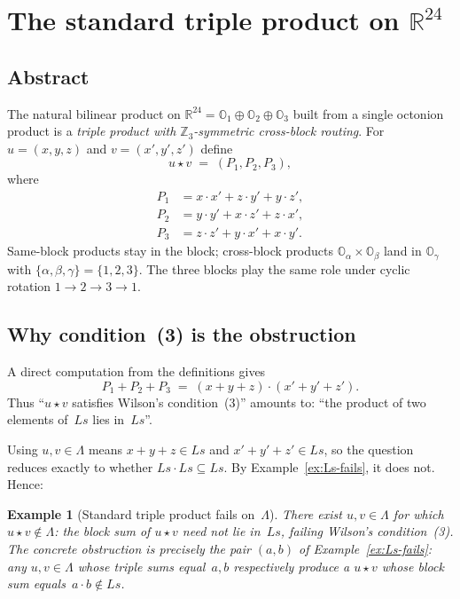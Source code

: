 \documentclass[11pt]{amsart}
\newcommand{\LL}{\Lambda}
\newcommand{\OO}{\mathbb{O}}
\newcommand{\ZZ}{\mathbb{Z}}
\newcommand{\RR}{\mathbb{R}}
\newtheorem{example}{Example}[section]
\begin{document}
\section{The standard triple product on $\RR^{24}$}

\subsection*{Abstract}

The natural bilinear product on $\RR^{24} = \OO_1 \oplus \OO_2
\oplus \OO_3$ built from a single octonion product is a
\emph{triple product with $\ZZ_3$-symmetric cross-block routing}.
For $u = (x, y, z)$ and $v = (x', y', z')$ define
\[
  u \star v \;=\; (P_1, P_2, P_3),
\]
where
\begin{align*}
  P_1 &= x \cdot x' + z \cdot y' + y \cdot z', \\
  P_2 &= y \cdot y' + x \cdot z' + z \cdot x', \\
  P_3 &= z \cdot z' + y \cdot x' + x \cdot y'.
\end{align*}
Same-block products stay in the block; cross-block products
$\OO_\alpha \times \OO_\beta$ land in $\OO_\gamma$ with
$\{\alpha, \beta, \gamma\} = \{1, 2, 3\}$.  The three blocks play
the same role under cyclic rotation $1 \to 2 \to 3 \to 1$.

\subsection*{Why condition~(3) is the obstruction}

A direct computation from the definitions gives
\[
  P_1 + P_2 + P_3 \;=\; (x + y + z) \cdot (x' + y' + z').
\]
Thus ``$u \star v$ satisfies Wilson's condition~(3)'' amounts to:
``the product of two elements of~$Ls$ lies in~$Ls$''.

Using $u, v \in \LL$ means $x + y + z \in Ls$ and $x' + y' + z'
\in Ls$, so the question reduces exactly to whether $Ls \cdot Ls
\subseteq Ls$.  By Example~\ref{ex:Ls-fails}, it does not.  Hence:

\begin{example}[Standard triple product fails on~$\LL$]
\label{ex:triple-fails}
There exist $u, v \in \LL$ for which $u \star v \notin \LL$: the
block sum of $u \star v$ need not lie in~$Ls$, failing Wilson's
condition~(3).  The concrete obstruction is precisely the pair
$(a, b)$ of Example~\ref{ex:Ls-fails}: any $u, v \in \LL$ whose
triple sums equal~$a, b$ respectively produce a $u \star v$ whose
block sum equals~$a \cdot b \notin Ls$.
\end{example}
\end{document}
